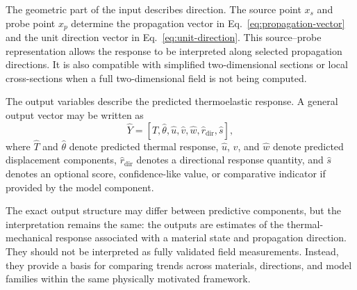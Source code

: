 The geometric part of the input describes direction. The source point \(x_s\) and probe point \(x_p\) determine the propagation vector in Eq.~\eqref{eq:propagation-vector} and the unit direction vector in Eq.~\eqref{eq:unit-direction}. This source--probe representation allows the response to be interpreted along selected propagation directions. It is also compatible with simplified two-dimensional sections or local cross-sections when a full two-dimensional field is not being computed.

The output variables describe the predicted thermoelastic response. A general output vector may be written as
\begin{equation}
\widehat{Y}
=
\left[
\widehat{T},
\widehat{\theta},
\widehat{u},
\widehat{v},
\widehat{w},
\widehat{r}_{\mathrm{dir}},
\widehat{s}
\right],
\end{equation}
where \(\widehat{T}\) and \(\widehat{\theta}\) denote predicted thermal response, \(\widehat{u}\), \(\widehat{v}\), and \(\widehat{w}\) denote predicted displacement components, \(\widehat{r}_{\mathrm{dir}}\) denotes a directional response quantity, and \(\widehat{s}\) denotes an optional score, confidence-like value, or comparative indicator if provided by the model component.

The exact output structure may differ between predictive components, but the interpretation remains the same: the outputs are estimates of the thermal-mechanical response associated with a material state and propagation direction. They should not be interpreted as fully validated field measurements. Instead, they provide a basis for comparing trends across materials, directions, and model families within the same physically motivated framework.
